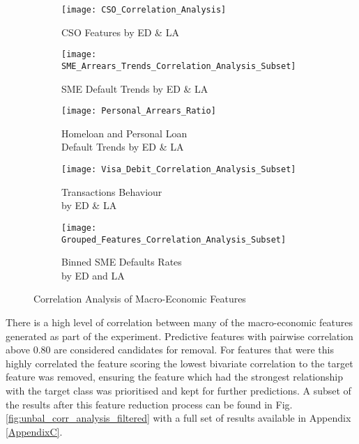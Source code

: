 \begin{figure}[H]
	\begin{adjustwidth}{-2cm}{-2cm}
	\centering
 	\begin{subfigure}[b]{0.6\textwidth}
 		\captionsetup{font=scriptsize}
 		\texttt{[image: CSO\_Correlation\_Analysis]}
 		\caption{CSO Features by ED \& LA\\}
 		\label{fig:CSOCorrelation}
 	\end{subfigure}
	\begin{subfigure}[b]{0.6\textwidth}
		\captionsetup{font=scriptsize}
		\texttt{[image: SME\_Arrears\_Trends\_Correlation\_Analysis\_Subset]}
		\caption{SME Default Trends by ED \& LA}\label{fig:smeArrearsCorrelation}
	\end{subfigure} 
		\medskip
	\begin{subfigure}[b]{0.6\textwidth}
		\captionsetup{font=scriptsize}
		\texttt{[image: Personal\_Arrears\_Ratio]}
		\caption{Homeloan and Personal Loan \\Default Trends by ED \& LA}
		\label{fig:personalArrearsCorrelation}
	\end{subfigure} 
	\begin{subfigure}[b]{0.6\textwidth}
		\captionsetup{font=scriptsize}
		\texttt{[image: Visa\_Debit\_Correlation\_Analysis\_Subset]}
		\caption{Transactions Behaviour \\by ED \& LA }\label{fig:transVisaCorrelation}
	\end{subfigure}
		\medskip	
	\begin{subfigure}[b]{0.6\textwidth}
		\captionsetup{font=scriptsize}
		\texttt{[image: Grouped\_Features\_Correlation\_Analysis\_Subset]}
		\caption{Binned SME Defaults Rates \\by ED and LA\\}
		\label{fig:groupedFeaturesCorrelation}
	\end{subfigure}
	\caption{Correlation Analysis of Macro-Economic Features}
	\label{fig:unbal_corr_analysis}
	\end{adjustwidth}
\end{figure}

There is a high level of correlation between many of the macro-economic features generated as part of the experiment. Predictive features with pairwise correlation above 0.80 are considered candidates for removal. For features that were this highly correlated the feature scoring the lowest bivariate correlation to the target feature was removed, ensuring the feature which had the strongest relationship with the target class was prioritised and kept for further predictions. A subset of the results after this feature reduction process can be found in Fig. \ref{fig:unbal_corr_analysis_filtered} with a full set of results available in Appendix \ref{AppendixC}. 

